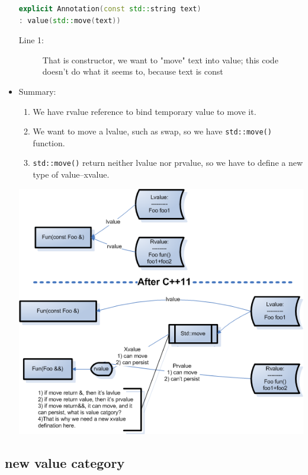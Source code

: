 \documentclass[a4paper,11pt,twoside]{book}
\begin{document}
\begin{itemize}
\begin{lstlisting}[frame=single, language=c++]
explicit Annotation(const std::string text)
: value(std::move(text)) 
\end{lstlisting}
\begin{description}
	\item[Line 1:] That is constructor, we want to "move" text into value; this code doesn't do what it seems to, because text is const
\end{description}
	
	\item Summary:
	\begin{enumerate}
		\item We have rvalue reference to bind temporary value to move it.
		\item We want to move a lvalue, such as swap, so we have \texttt{std::move()} function.
		\item \texttt{std::move()} return neither lvalue nor prvalue, so we have to define a new type of value--xvalue.
	\end{enumerate}
	
\begin{center}	
		\includegraphics[width=0.7\linewidth]{pics/xvalue.png}
		\label{fig:xvalue}
    \end{center}
\end{itemize}


\subsection{new value category}
\end{document}
